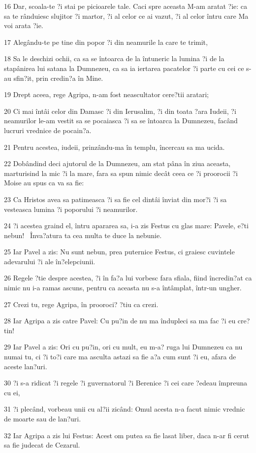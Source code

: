 \par 16 Dar, scoala-te ?i stai pe picioarele tale. Caci spre aceasta M-am aratat ?ie: ca sa te rânduiesc slujitor ?i martor, ?i al celor ce ai vazut, ?i al celor întru care Ma voi arata ?ie.
\par 17 Alegându-te pe tine din popor ?i din neamurile la care te trimit,
\par 18 Sa le deschizi ochii, ca sa se întoarca de la întuneric la lumina ?i de la stapânirea lui satana la Dumnezeu, ca sa ia iertarea pacatelor ?i parte cu cei ce s-au sfin?it, prin credin?a în Mine.
\par 19 Drept aceea, rege Agripa, n-am fost neascultator cere?tii aratari;
\par 20 Ci mai întâi celor din Damasc ?i din Ierusalim, ?i din toata ?ara Iudeii, ?i neamurilor le-am vestit sa se pocaiasca ?i sa se întoarca la Dumnezeu, facând lucruri vrednice de pocain?a.
\par 21 Pentru acestea, iudeii, prinzându-ma în templu, încercau sa ma ucida.
\par 22 Dobândind deci ajutorul de la Dumnezeu, am stat pâna în ziua aceasta, marturisind la mic ?i la mare, fara sa spun nimic decât ceea ce ?i proorocii ?i Moise au spus ca va sa fie:
\par 23 Ca Hristos avea sa patimeasca ?i sa fie cel dintâi înviat din mor?i ?i sa vesteasca lumina ?i poporului ?i neamurilor.
\par 24 ?i acestea graind el, întru apararea sa, i-a zis Festus cu glas mare: Pavele, e?ti nebun!  Înva?atura ta cea multa te duce la nebunie.
\par 25 Iar Pavel a zis: Nu sunt nebun, prea puternice Festus, ci graiesc cuvintele adevarului ?i ale în?elepciunii.
\par 26 Regele ?tie despre acestea, ?i în fa?a lui vorbesc fara sfiala, fiind încredin?at ca nimic nu i-a ramas ascuns, pentru ca aceasta nu s-a întâmplat, într-un ungher.
\par 27 Crezi tu, rege Agripa, în prooroci? ?tiu ca crezi.
\par 28 Iar Agripa a zis catre Pavel: Cu pu?in de nu ma îndupleci sa ma fac ?i eu cre?tin!
\par 29 Iar Pavel a zis: Ori cu pu?in, ori cu mult, eu m-a? ruga lui Dumnezeu ca nu numai tu, ci ?i to?i care ma asculta astazi sa fie a?a cum sunt ?i eu, afara de aceste lan?uri.
\par 30 ?i s-a ridicat ?i regele ?i guvernatorul ?i Berenice ?i cei care ?edeau împreuna cu ei,
\par 31 ?i plecând, vorbeau unii cu al?ii zicând: Omul acesta n-a facut nimic vrednic de moarte sau de lan?uri.
\par 32 Iar Agripa a zis lui Festus: Acest om putea sa fie lasat liber, daca n-ar fi cerut sa fie judecat de Cezarul.

